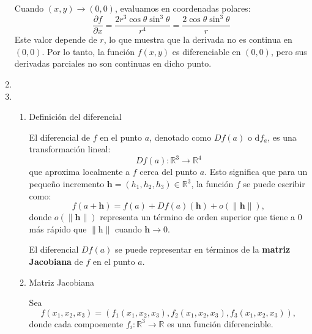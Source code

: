\begin{enumerate}[label=\color{red}\textbf{\arabic*)}, leftmargin=*]
Cuando $(x,y)\to(0,0)$, evaluamos en coordenadas polares: $$
\dfrac{ \partial f }{ \partial x }=\dfrac{2r^{3}\cos\theta \sin ^{3}\theta}{r^4}=\dfrac{2\cos\theta \sin ^{3}\theta}{r} 
$$
Este valor depende de $r$, lo que muestra que la derivada no es continua en $(0,0)$. Por lo tanto, la función $f(x,y)$ es diferenciable en $(0,0)$, pero sus derivadas parciales no son continuas en dicho punto.

\item {}

\item {}

\begin{enumerate}[label=\arabic*)]
\item Definición del diferencial

El diferencial de $f$ en el punto $a$, denotado como $Df(a)$ o $\mathrm{d}f_{a}$, es una transformación lineal:$$
Df(a):\mathbb{R}^{3}\to \mathbb{R}^4
$$que aproxima localmente a $f$ cerca del punto $a$. Esto significa que para un pequeño incremento $\mathbf{h}=(h_{1},h_{2},h_{3})\in\mathbb{R}^{3}$, la función $f$ se puede escribir como: $$
f(a+\mathbf{h})=f(a)+Df(a)(\mathbf{h})+o(\|\mathbf{h}\|),
$$
donde $o(\|\mathbf{h}\|)$ representa un término de orden superior que tiene a 0 más rápido que $\|\mathrm{h}\|$ cuando $\mathbf{h}\to 0$.

El diferencial $Df(a)$ se puede representar en términos de la \textbf{matriz Jacobiana} de $f$ en el punto $a$.

\item Matriz Jacobiana

Sea $$
f(x_{1},x_{2},x_{3})=(f_{1}(x_{1},x_{2},x_{3}),f_{2}(x_{1},x_{2},x_{3}),f_{3}(x_{1},x_{2},x_{3})),
$$donde cada compoenente $f_{i}:\mathbb{R}^{3}\to \mathbb{R}$ es una función diferenciable.


\end{enumerate}
\end{enumerate}
